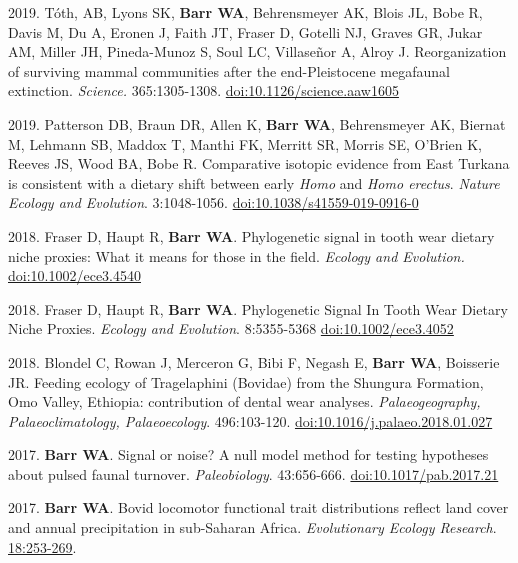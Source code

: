 \begin{etaremune}
\item 2019. Tóth, AB, Lyons SK, {\bfseries Barr WA}, Behrensmeyer AK, Blois JL, Bobe R, Davis M, Du A, Eronen J, Faith JT, Fraser D, Gotelli NJ, Graves GR, Jukar AM, Miller JH, Pineda-Munoz S, Soul LC, Villaseñor A, Alroy J. Reorganization of surviving mammal communities after the end-Pleistocene megafaunal extinction. \emph{Science.} 365:1305-1308. \href{https://dx.doi.org/10.1126/science.aaw1605 }{doi:10.1126/science.aaw1605}

\item 2019. Patterson DB, Braun DR, Allen K, {\bfseries Barr WA}, Behrensmeyer AK, Biernat M, Lehmann SB, Maddox T, Manthi FK, Merritt SR, Morris SE, O'Brien K, Reeves JS, Wood BA, Bobe R. Comparative isotopic evidence from East Turkana is consistent with a dietary shift between early \emph{Homo} and \emph{Homo erectus}. \emph{Nature Ecology and Evolution}. 3:1048-1056. \href{https://dx.doi.org/10.1038/s41559-019-0916-0}{doi:10.1038/s41559-019-0916-0}



\item 2018. Fraser D, Haupt R,  {\bfseries Barr WA}. Phylogenetic signal in tooth wear dietary niche proxies: What it means for those in the field. \emph{Ecology and Evolution.} \href{https://dx.doi.org/10.1002/ece3.4540}{doi:10.1002/ece3.4540}


\item  2018. Fraser D, Haupt R,  {\bfseries Barr WA}. Phylogenetic Signal In Tooth Wear Dietary Niche Proxies. \emph{Ecology and Evolution}. 8:5355-5368 \href{https://doi.org/10.1002/ece3.4052}{doi:10.1002/ece3.4052}

\item  2018. Blondel C, Rowan J, Merceron G, Bibi F,  Negash E, {\bfseries Barr WA}, Boisserie JR. Feeding ecology of Tragelaphini (Bovidae) from the Shungura Formation, Omo Valley, Ethiopia: contribution of dental wear analyses.  \emph{Palaeogeography, Palaeoclimatology, Palaeoecology}. 496:103-120. \href{https://doi.org/10.1016/j.palaeo.2018.01.027}{doi:10.1016/j.palaeo.2018.01.027}


\item  2017. {\bfseries Barr WA}. Signal or noise? A null model method for testing hypotheses about pulsed faunal turnover. \emph{Paleobiology}. 43:656-666. \href{https://doi.org/10.1017/pab.2017.21}{doi:10.1017/pab.2017.21}

\item  2017. {\bfseries Barr WA}. Bovid locomotor functional trait distributions reflect land cover and annual precipitation in sub-Saharan Africa. \emph{Evolutionary Ecology Research}.  \href{http://www.evolutionary-ecology.com/issues/v18/n03/ddar3051.pdf}{18:253-269}.



\end{etaremune}
